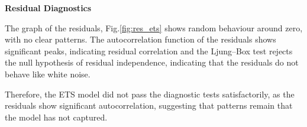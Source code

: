 \noindent\textbf{Residual Diagnostics}

The graph of the residuals, Fig.\ref{fig:res_ets} shows random behaviour around zero, with no clear patterns.
The autocorrelation function of the residuals shows significant peaks, indicating residual correlation and the Ljung–Box test rejects the null hypothesis of residual independence, indicating that the residuals do not behave like white noise.

Therefore, the ETS model did not pass the diagnostic tests satisfactorily, as the residuals show significant autocorrelation, suggesting that patterns remain that the model has not captured.